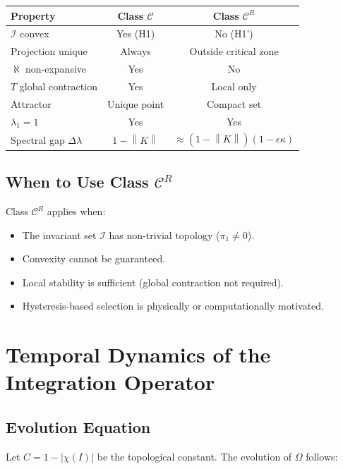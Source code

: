 \documentclass[11pt,a4paper]{article}
\theoremstyle{plain}
\theoremstyle{definition}
\newcommand{\I}{\mathcal{I}}
\newcommand{\norm}[1]{\left\lVert #1 \right\rVert}
\begin{document}
\begin{center}
\begin{tabular}{|l|c|c|}
\hline
\textbf{Property} & \textbf{Class $\mathscr{C}$} & \textbf{Class $\mathscr{C}^R$} \\
\hline
$\I$ convex & Yes (H1) & No (H1') \\
Projection unique & Always & Outside critical zone \\
$\aleph$ non-expansive & Yes & No \\
$T$ global contraction & Yes & Local only \\
Attractor & Unique point & Compact set \\
$\lambda_1 = 1$ & Yes & Yes \\
Spectral gap $\Delta\lambda$ & $1 - \norm{K}$ & $\approx (1-\norm{K})(1 - \epsilon\kappa)$ \\
\hline
\end{tabular}
\end{center}

\subsection{When to Use Class $\mathscr{C}^R$}

Class $\mathscr{C}^R$ applies when:
\begin{itemize}
    \item The invariant set $\I$ has non-trivial topology ($\pi_1 \neq 0$).
    \item Convexity cannot be guaranteed.
    \item Local stability is sufficient (global contraction not required).
    \item Hysteresis-based selection is physically or computationally motivated.
\end{itemize}

\section{Temporal Dynamics of the Integration Operator}

\subsection{Evolution Equation}

Let $C = 1 - |\chi(I)|$ be the topological constant. The evolution of $\Omega$ follows:
\end{document}
